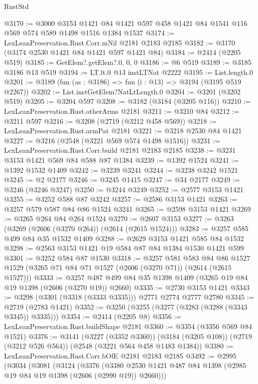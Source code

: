 \begin{lexlean}{RustStd}
\begin{coremodule}
@3170 := @3000
    @3153
    @1421
    @84
    @1421
    @597
    @458
    @1421
    @84
    @1541
    @116
    @569
    @574
    @589
    @1498
    @1516
    @1384
    @1537
@3174 := LexLeanPreservation.Rust.Corr.mNil @2181 @2183 @2185
@3182 := @3170 (@3174 @2530 @1421 @84 @1421 @597 @1421 @84)
@3184 := @2414 (@2205 @519)
@3185 := GetElem?.getElem?.{0, 0, 0}
@3186 := @6 @519
@3189 := @3185 @3186 @13 @519
@3194 := LT.lt.{0} @13 instLTNat @2222
@3195 := List.length.{0}
@3201 := @3189 (fun (as : @3186) => fun (i : @13) => @3194 (@3195 @519 @2267))
@3202 := List.instGetElem?NatLtLength.{0}
@3204 := @3201 (@3202 @519)
@3205 := @3204 @597
@3208 := @3182 (@3184 (@3205 @116))
@3210 := LexLeanPreservation.Rust.otherArms @2181
@3211 := @3210 @84
@3212 := @3211 @597
@3216 := @3208 (@2719 (@3212 @458 @569))
@3218 := LexLeanPreservation.Rust.armPat @2181
@3221 := @3218 @2530 @84 @1421
@3227 := @3216 (@2548 (@3221 @569 @574 @1498 @1516))
@3231 := LexLeanPreservation.Rust.Corr.build @2181 @2183 @2185
@3238 := @3231 @3153 @1421 @569 @84 @588 @87 @1384
@3239 := @1392 @1524
@3241 := @1392 @1532 @1409
@3242 := @3239 @3241
@3244 := @3238 @3242 @1521
@3245 := @2 @2177
@3246 := @3245 @1415
@3247 := @34 @2177
@3249 := @3246 (@3246 @3247)
@3250 := @3244 @3249
@3252 := @2577 @3153 @1421
@3255 := @3252 @588 @87 @3242
@3257 := @2586 @3153 @1421
@3263 := @3257 @579 @587 @84 @86 @1524 @3241
@3265 := @2598 @3153 @1421
@3269 := @3265 @264 @84 @264 @1524
@3270 := @2607 @3153
@3277 := @3263 (@3269 (@2606 (@3270 @264)) (@2614 (@2615 @1524)))
@3283 := @3257 @585 @499 @84 @35 @1532 @1409
@3288 := @2629 @3153 @1421 @585 @84 @1532
@3298 := @2563 @3153 @1421 @19 @584 @87 @84 @1384 @1530 @1421 @599
@3301 := @3252 @584 @87 @1530
@3318 := @3257
    @581
    @583
    @84
    @86
    @1527
    @1529
    (@3265 @71 @84 @71 @1527 (@2606 (@3270 @71)) (@2614 (@2615 @1527)))
@3333 := @3257 @487 @499 @84 @35 @1398 @1409 (@3265 @19 @84 @19 @1398 (@2606 (@3270 @19)) @2660)
@3335 := @2730 @3153 @1421
@3343 := @3298 (@3301 (@3318 (@3333 @3335))) @2771 @2774 @2777 @2780
@3345 := @2719 (@2783 @1421)
@3352 := @3250 (@3255 (@3277 (@3283 (@3288 (@3343 @3345)) @3335)))
@3354 := @2414 (@2205 @8)
@3356 := LexLeanPreservation.Rust.buildShape @2181
@3360 := @3354 (@3356 @569 @84 @1521)
@3376 := @3141
    (@3227 (@3352 @3360))
    (@3184 (@3205 @108))
    (@2719 (@3212 @526 @564))
    (@2548 (@3221 @564 @458 @1483 @1384))
@3380 := LexLeanPreservation.Rust.Corr.bOfE @2181 @2183 @2185
@3492 := @2995
    (@3034
      (@3081
        (@3124
          (@3376
            (@3380 @2530 @1421 @487 @84 @1398 (@2985 @19 @84 @19 @1398 (@2606 (@2990 @19)) @2660)))

\end{coremodule}
\end{lexlean}
